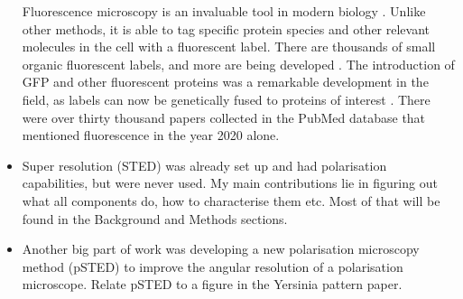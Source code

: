 \begin{itemize}
	Fluorescence microscopy is an invaluable tool in modern biology \cite{Danial2016}. Unlike other methods, it is able to tag specific protein species and other relevant molecules in the cell with a fluorescent label. There are thousands of small organic fluorescent labels, and more are being developed \cite{Zhang2002, Resch-Genger2008}. The introduction of GFP and other fluorescent proteins was a remarkable development in the field, as labels can now be genetically fused to proteins of interest \cite{Shaner2005, Matlashov2020}. There were over thirty thousand papers collected in the PubMed database that mentioned fluorescence in the year 2020 alone.
	
	\item Super resolution (STED) was already set up and had polarisation capabilities, but were never used. My main contributions lie in figuring out what all components do, how to characterise them etc. Most of that will be found in the Background and Methods sections.
	
	\item Another big part of work was developing a new polarisation microscopy method (pSTED) to improve the angular resolution of a polarisation microscope. Relate pSTED to a figure in the Yersinia pattern paper.
	
\end{itemize}